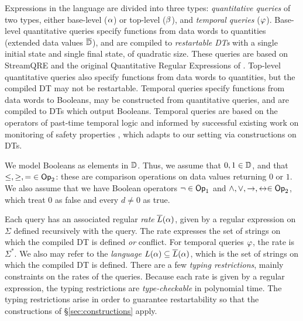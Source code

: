 Expressions in the language are divided into three types: \emph{quantitative queries} of two types, either base-level ($\alpha$) or top-level ($\beta$), and \emph{temporal queries} ($\varphi$). Base-level quantitative queries specify functions from data words to quantities (extended data values $\overline{\mathbb{D}{}}$), and are compiled to \emph{restartable DTs} with a single initial state and single final state, of quadratic size. These queries are based on StreamQRE and the original Quantitative Regular Expressions of \cite{AFR2016QRE}. Top-level quantitative queries also specify functions from data words to quantities, but the compiled DT may not be restartable. Temporal queries specify functions from data words to Booleans, may be constructed from quantitative queries, and are compiled to DTs which output Booleans. Temporal queries are based on the operators of past-time temporal logic \cite{manna2012temporal} and informed by successful existing work on monitoring of safety properties \cite{havelund2004efficient}, which adapts to our setting via constructions on DTs.

We model Booleans as elements in $\mathbb{D}$. Thus, we assume that $0, 1 \in \mathbb{D}$, and that $\le, \ge, = \;\in \textsf{Op}_2$: these are comparison operations on data values returning $0$ or $1$. We also assume that we have Boolean operators $\lnot \in \textsf{Op}_1$ and $\land, \lor, \to, \leftrightarrow \in \textsf{Op}_2$,
which treat $0$ as false and every $d \ne 0$ as true.

Each query has an associated regular \emph{rate} $\overline{L}(\alpha)$, given by a regular expression on $\Sigma$ defined recursively with the query. The rate expresses the set of strings on which the compiled DT is defined \emph{ or } conflict. For temporal queries $\varphi$, the rate is $\Sigma^{*}$. We also may refer to the \emph{language} $L(\alpha) \subseteq \overline{L}(\alpha)$, which is the set of strings on which the compiled DT is defined.
There are a few \emph{typing restrictions}, mainly constraints on the rates of the queries. Because each rate is given by a regular expression, the typing restrictions are \emph{type-checkable} in polynomial time.
The typing restrictions arise in order to guarantee restartability so that the constructions of \S\ref{sec:constructions} apply.

